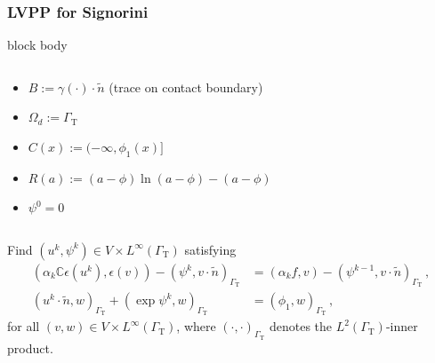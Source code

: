 \documentclass[aspectratio=169,xcolor=dvipsnames,11pt]{beamer}
\newcommand{\C}{\mathbb C}
\begin{document}
\begin{frame}\frametitle{LVPP for Signorini}
\begin{minipage}{\linewidth}
\begin{beamercolorbox}[rounded=true, shadow=true, wd=\textwidth]{block body}

\begin{columns}
\begin{column}{0.55\textwidth}
\begin{itemize}
\item $B := \gamma(\cdot) \cdot \tilde{n}$ (trace on contact boundary)
\item $\Omega_d := \Gamma_\mathrm{T}$
\item $C(x) := (-\infty,\phi_1(x)]$
\item $R(a) := (a-\phi) \ln (a - \phi) - (a - \phi)$
\item $\psi^0 = 0$
\end{itemize}
\end{column}
\begin{column}{0.3\textwidth}  %
\begin{minipage}{0.3\linewidth}
 \centering
\begin{figure}
	\centering
\end{figure}
\end{minipage}
\end{column}
\end{columns}
Find $(u^{k}, \psi^{k}) \in V \times L^\infty(\Gamma_\mathrm{T})$ satisfying
\begin{subequations}
\label{eq:SignoriniVF}
\begin{align}
    ( \alpha_k\C \epsilon(u^k), \epsilon(v) ) - (\psi^k, v\cdot \tilde{n} )_{\Gamma_\mathrm{T}}
    &=
    (\alpha_k f, v) - ( \psi^{k-1}, v \cdot \tilde{n} )_{\Gamma_\mathrm{T}}
    \,,
    \\
    ( u^k\cdot \tilde{n} , w )_{\Gamma_\mathrm{T}} + ( \exp \psi^k, w )_{\Gamma_\mathrm{T}}
    &= ( \phi_1, w )_{\Gamma_\mathrm{T}}
    \,,
\end{align}
\end{subequations}
for all $(v, w) \in V \times L^\infty(\Gamma_\mathrm{T})$, where $(\cdot, \cdot  )_{\Gamma_\mathrm{T}}$ denotes the $L^2(\Gamma_\mathrm{T})$-inner product.
\end{beamercolorbox}
\end{minipage}
\end{frame}
\end{document}
